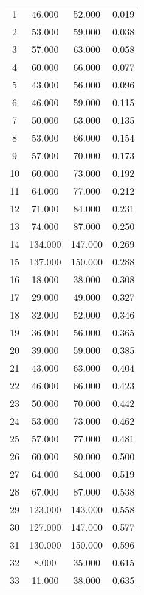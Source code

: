 % 
\begin{tabular}{cccc}
  \hline
  \hline
1 & 46.000 & 52.000 & 0.019 \\ 
  2 & 53.000 & 59.000 & 0.038 \\ 
  3 & 57.000 & 63.000 & 0.058 \\ 
  4 & 60.000 & 66.000 & 0.077 \\ 
  5 & 43.000 & 56.000 & 0.096 \\ 
  6 & 46.000 & 59.000 & 0.115 \\ 
  7 & 50.000 & 63.000 & 0.135 \\ 
  8 & 53.000 & 66.000 & 0.154 \\ 
  9 & 57.000 & 70.000 & 0.173 \\ 
  10 & 60.000 & 73.000 & 0.192 \\ 
  11 & 64.000 & 77.000 & 0.212 \\ 
  12 & 71.000 & 84.000 & 0.231 \\ 
  13 & 74.000 & 87.000 & 0.250 \\ 
  14 & 134.000 & 147.000 & 0.269 \\ 
  15 & 137.000 & 150.000 & 0.288 \\ 
  16 & 18.000 & 38.000 & 0.308 \\ 
  17 & 29.000 & 49.000 & 0.327 \\ 
  18 & 32.000 & 52.000 & 0.346 \\ 
  19 & 36.000 & 56.000 & 0.365 \\ 
  20 & 39.000 & 59.000 & 0.385 \\ 
  21 & 43.000 & 63.000 & 0.404 \\ 
  22 & 46.000 & 66.000 & 0.423 \\ 
  23 & 50.000 & 70.000 & 0.442 \\ 
  24 & 53.000 & 73.000 & 0.462 \\ 
  25 & 57.000 & 77.000 & 0.481 \\ 
  26 & 60.000 & 80.000 & 0.500 \\ 
  27 & 64.000 & 84.000 & 0.519 \\ 
  28 & 67.000 & 87.000 & 0.538 \\ 
  29 & 123.000 & 143.000 & 0.558 \\ 
  30 & 127.000 & 147.000 & 0.577 \\ 
  31 & 130.000 & 150.000 & 0.596 \\ 
  32 & 8.000 & 35.000 & 0.615 \\ 
  33 & 11.000 & 38.000 & 0.635 \\ 

\end{tabular}
